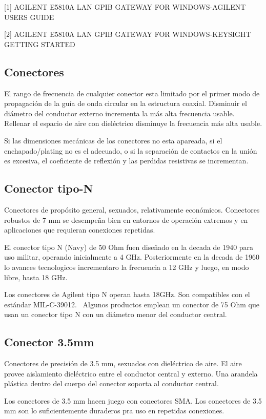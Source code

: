 \documentclass[paper=letter,oneside,fontsize=10pt,parskip=full]{article}
\begin{document}
[1] AGILENT E5810A LAN GPIB GATEWAY FOR WINDOWS-AGILENT USERS GUIDE

[2] AGILENT E5810A LAN GPIB GATEWAY FOR WINDOWS-KEYSIGHT GETTING STARTED

\subsection{Conectores}
El rango de frecuencia de cualquier conector esta limitado por el primer modo de propagación de la guía de onda circular
en la estructura coaxial. Disminuir el diámetro del conductor externo incrementa la más alta frecuencia usable.
Rellenar el espacio de aire con dieléctrico disminuye la frecuencia más alta usable.

Si las dimensiones mecánicas de los conectores no esta apareada, si el enchapado/plating no es el adecuado, o si la
separación de contactos en la unión es excesiva, el coeficiente de reflexión y las perdidas resistivas se incrementan.

\subsection{Conector tipo-N}
Conectores de propósito general, sexuados, relativamente económicos. Conectores robustos de 7 mm se desempeña bien en
entornos de operación extremos y en aplicaciones que requieran conexiones repetidas.

El conector tipo N (Navy) de 50 Ohm fuen diseñado en la decada de 1940 para uso militar, operando inicialmente a 4 GHz.
Posteriormente en la decada de 1960 lo avances tecnologicos incrementaro la frecuencia a 12 GHz y luego, en modo libre,
hasta 18 GHz.

Los conectores de Agilent tipo N operan hasta 18GHz. Son compatibles con el estándar MIL-C-39012. \ Algunos productos
emplean un conector de 75 Ohm que usan un conector tipo N con un diámetro menor del conductor central.


\bigskip

\subsection{Conector 3.5mm}
Conectores de precisión de 3.5 mm, sexuados con dieléctrico de aire. El aire provee aislamiento dieléctrico entre el
conductor central y externo. Una arandela plástica dentro del cuerpo del conector soporta al conductor central.

Los conectores de 3.5 mm hacen juego con conectores SMA. Los conectores de 3.5 mm son lo suficientemente duraderos pra
uso en repetidas conexiones.
\end{document}
